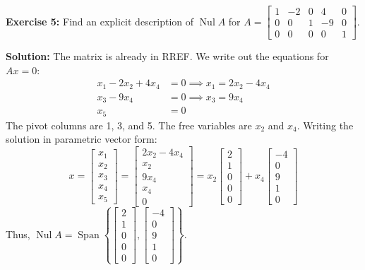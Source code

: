 \documentclass[11pt]{article}
\begin{document}
\vspace{0.5cm}

\textbf{Exercise 5:} Find an explicit description of $\operatorname{Nul} A$ for $A = \begin{bmatrix} 1 & -2 & 0 & 4 & 0 \\ 0 & 0 & 1 & -9 & 0 \\ 0 & 0 & 0 & 0 & 1 \end{bmatrix}$.

\textbf{Solution:}
The matrix is already in RREF. We write out the equations for $Ax = 0$:
\begin{align*}
x_1 - 2x_2 + 4x_4 &= 0 \implies x_1 = 2x_2 - 4x_4 \\
x_3 - 9x_4 &= 0 \implies x_3 = 9x_4 \\
x_5 &= 0
\end{align*}
The pivot columns are 1, 3, and 5. The free variables are $x_2$ and $x_4$. Writing the solution in parametric vector form:
\[
x = \begin{bmatrix} x_1 \\ x_2 \\ x_3 \\ x_4 \\ x_5 \end{bmatrix} = \begin{bmatrix} 2x_2 - 4x_4 \\ x_2 \\ 9x_4 \\ x_4 \\ 0 \end{bmatrix} = x_2 \begin{bmatrix} 2 \\ 1 \\ 0 \\ 0 \\ 0 \end{bmatrix} + x_4 \begin{bmatrix} -4 \\ 0 \\ 9 \\ 1 \\ 0 \end{bmatrix}
\]
Thus, $\operatorname{Nul} A = \operatorname{Span} \left\{ \begin{bmatrix} 2 \\ 1 \\ 0 \\ 0 \\ 0 \end{bmatrix}, \begin{bmatrix} -4 \\ 0 \\ 9 \\ 1 \\ 0 \end{bmatrix} \right\}$.
\end{document}

